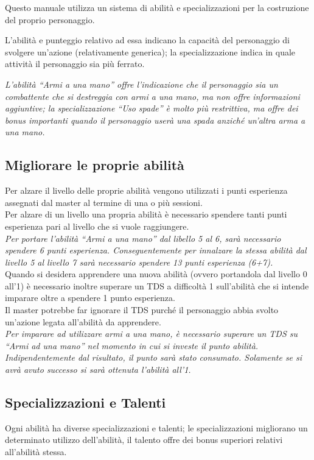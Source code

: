\documentclass[../manuale_main.tex]{subfiles}
\begin{document}
Questo manuale utilizza un sistema di abilità e specializzazioni per la costruzione del proprio personaggio.

L'abilità e punteggio relativo ad essa indicano la capacità del personaggio di svolgere un'azione (relativamente generica); la specializzazione indica in quale attività il personaggio sia più ferrato.

 \emph{L'abilità ``Armi a una mano” offre l'indicazione che il personaggio sia un combattente che si destreggia con armi a una mano, ma non offre informazioni aggiuntive; la specializzazione ``Uso spade” è molto più restrittiva, ma offre dei bonus importanti quando il personaggio userà una spada anziché un'altra arma a una mano.}

\subsection{Migliorare le proprie abilità}
Per alzare il livello delle proprie abilità vengono utilizzati i punti esperienza assegnati dal master al termine di una o più sessioni.\\
Per alzare di un livello una propria abilità è necessario spendere tanti punti esperienza pari al livello che si vuole raggiungere.\\
\emph{Per portare l'abilità ``Armi a una mano” dal libello 5 al 6, sarà necessario spendere 6 punti esperienza. Conseguentemente per innalzare la stessa abilità dal livello 5 al livello 7 sarà necessario spendere 13 punti esperienza (6+7).}\\
Quando si desidera apprendere una nuova abilità (ovvero portandola dal livello 0 all'1) è necessario inoltre superare un TDS a difficoltà 1 sull'abilità che si intende imparare oltre a spendere 1 punto esperienza. \\
Il master potrebbe far ignorare il TDS purché il personaggio abbia svolto un'azione legata all'abilità da apprendere.\\
\emph{Per imparare ad utilizzare armi a una mano, è necessario superare un TDS su ``Armi ad una mano” nel momento in cui si investe il punto abilità. Indipendentemente dal risultato, il punto sarà stato consumato. Solamente se si avrà avuto successo si sarà ottenuta l'abilità all'1.}

\subsection{Specializzazioni e Talenti}
Ogni abilità ha diverse specializzazioni e talenti; le specializzazioni migliorano un determinato utilizzo dell'abilità, il talento offre dei bonus superiori relativi all'abilità stessa.
\end{document}
